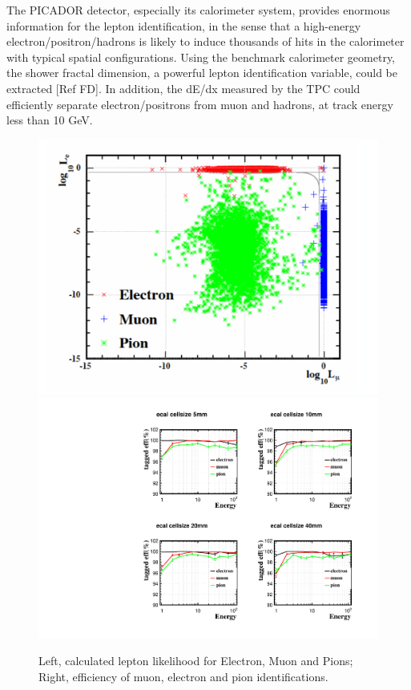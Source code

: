 The PICADOR detector, especially its calorimeter system, provides enormous information for the lepton identification,
in the sense that a high-energy electron/positron/hadrons is likely to induce thousands
of hits in the calorimeter with typical spatial configurations. Using the benchmark calorimeter geometry,
the shower fractal dimension, a powerful lepton identification variable, could be extracted [Ref FD].
In addition, the dE/dx measured by the TPC could efficiently separate electron/positrons from muon and hadrons,
at track energy less than 10 GeV.
\begin{figure}[h!]
\centering
\includegraphics[scale=0.22]{Figures/Performance/dan/2dlikeness.pdf}
\includegraphics[scale=0.30]{Figures/Performance/dan/eff_ES.pdf}
\caption{Left, calculated lepton likelihood for Electron, Muon and Pions;
  Right, efficiency of muon, electron and pion identifications. }
\label{fig:performance-lepton}
\end{figure}

